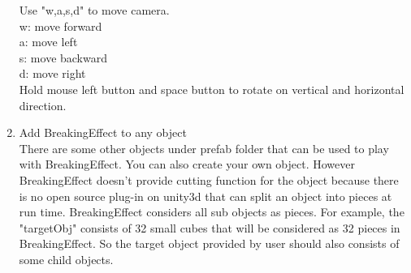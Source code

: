 \documentclass[12pt, titlepage]{article}
\begin{document}
\begin{enumerate}
		Use "w,a,s,d" to move camera.\\
		w: move forward\\
		a: move left\\
		s: move backward\\
		d: move right\\
		Hold mouse left button and space button to rotate on vertical and horizontal direction.
		\item{Add BreakingEffect to any object}\\
		There are some other objects under prefab folder that can be used to play with BreakingEffect. You can also create your own object. However BreakingEffect doesn't provide cutting function for the object because there is no open source plug-in on unity3d that can split an object into pieces at run time. BreakingEffect considers all sub objects as pieces. For example, the "targetObj" consists of 32 small cubes that will be considered as 32 pieces in BreakingEffect. So the target object provided by user should also consists of some child objects.
	\end{enumerate}
\end{document}
